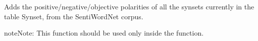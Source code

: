 \documentclass[letterpaper,10pt,english]{sphinxmanual}
\begin{document}
\begin{fulllineitems}
\label{\detokenize{index:loacore.process.synset_process.add_polarity_to_synsets}}
Adds the positive/negative/objective polarities of all the synsets currently in the table
Synset, from the SentiWordNet corpus.

\begin{sphinxadmonition}{note}{Note:}
This function should be used only inside the  function.
\end{sphinxadmonition}

\end{fulllineitems}

\end{document}
